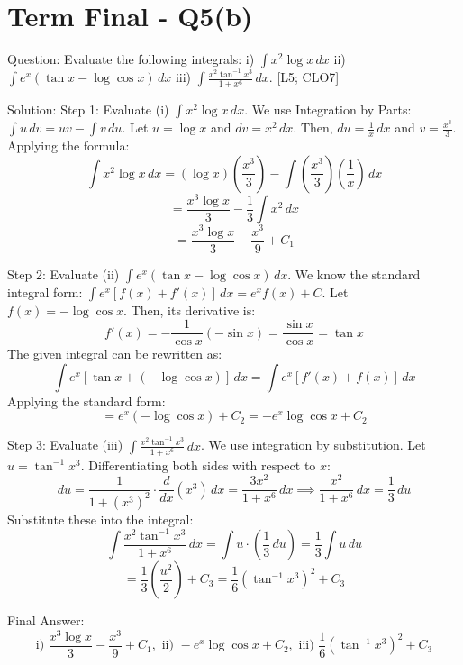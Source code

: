 \documentclass[11pt, a4paper]{article}
\begin{document}
\section*{Term Final - Q5(b)}

Question:
Evaluate the following integrals:
i) $\int x^2 \log x \, dx$
ii) $\int e^x(\tan x - \log\cos x) \, dx$
iii) $\int \frac{x^2 \tan^{-1} x^3}{1+x^6} \, dx$. [L5; CLO7]

Solution:
Step 1: Evaluate (i) $\int x^2 \log x \, dx$.
We use Integration by Parts: $\int u \, dv = uv - \int v \, du$.
Let $u = \log x$ and $dv = x^2 \, dx$.
Then, $du = \frac{1}{x} \, dx$ and $v = \frac{x^3}{3}$.
Applying the formula:
\[
\int x^2 \log x \, dx = (\log x) \left(\frac{x^3}{3}\right) - \int \left(\frac{x^3}{3}\right) \left(\frac{1}{x}\right) \, dx
\]
\[
= \frac{x^3 \log x}{3} - \frac{1}{3} \int x^2 \, dx
\]
\[
= \frac{x^3 \log x}{3} - \frac{x^3}{9} + C_1
\]

Step 2: Evaluate (ii) $\int e^x(\tan x - \log\cos x) \, dx$.
We know the standard integral form: $\int e^x [f(x) + f'(x)] \, dx = e^x f(x) + C$.
Let $f(x) = -\log\cos x$.
Then, its derivative is:
\[
f'(x) = -\frac{1}{\cos x} (-\sin x) = \frac{\sin x}{\cos x} = \tan x
\]
The given integral can be rewritten as:
\[
\int e^x [ \tan x + (-\log\cos x) ] \, dx = \int e^x [ f'(x) + f(x) ] \, dx
\]
Applying the standard form:
\[
= e^x (-\log\cos x) + C_2 = -e^x \log\cos x + C_2
\]

Step 3: Evaluate (iii) $\int \frac{x^2 \tan^{-1} x^3}{1+x^6} \, dx$.
We use integration by substitution.
Let $u = \tan^{-1} x^3$.
Differentiating both sides with respect to $x$:
\[
du = \frac{1}{1 + (x^3)^2} \cdot \frac{d}{dx}(x^3) \, dx = \frac{3x^2}{1+x^6} \, dx \implies \frac{x^2}{1+x^6} \, dx = \frac{1}{3} \, du
\]
Substitute these into the integral:
\[
\int \frac{x^2 \tan^{-1} x^3}{1+x^6} \, dx = \int u \cdot \left(\frac{1}{3} \, du\right) = \frac{1}{3} \int u \, du
\]
\[
= \frac{1}{3} \left(\frac{u^2}{2}\right) + C_3 = \frac{1}{6} (\tan^{-1} x^3)^2 + C_3
\]

Final Answer:
\[
\boxed{\text{i) } \frac{x^3 \log x}{3} - \frac{x^3}{9} + C_1, \text{ ii) } -e^x \log\cos x + C_2, \text{ iii) } \frac{1}{6} (\tan^{-1} x^3)^2 + C_3}
\]


\end{document}
